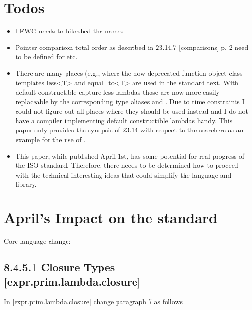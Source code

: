 \documentclass[ebook,11pt,article]{memoir}
\begin{document}
\chapter{Todos}
\begin{itemize}
\item
LEWG needs to bikeshed the names.

\item
Pointer comparison total order as described in 23.14.7 [comparisons] p. 2 need to be defined for  etc.

\item 
There are many places (e.g., where the now deprecated function object class templates less<T> and equal_to<T> are used in the standard text. With default constructible capture-less lambdas those are now more easily replaceable by the corresponding type aliases  and . Due to time constraints I could not figure out all places where they should be used instead and I do not have a compiler implementing default constructible lambdas handy. This paper only provides the synopsis of 23.14 with respect to the searchers as an example for the use of .

\item
This paper, while published April 1st, has some potential for real progress of the ISO \Cpp{} standard. Therefore, there needs to be determined how to proceed with the technical interesting ideas that could simplify the language and library.
\end{itemize}

\chapter{April's Impact on the standard}

Core language change:
\section{8.4.5.1 Closure Types [expr.prim.lambda.closure]}

In [expr.prim.lambda.closure] change paragraph 7 as follows
\end{document}
